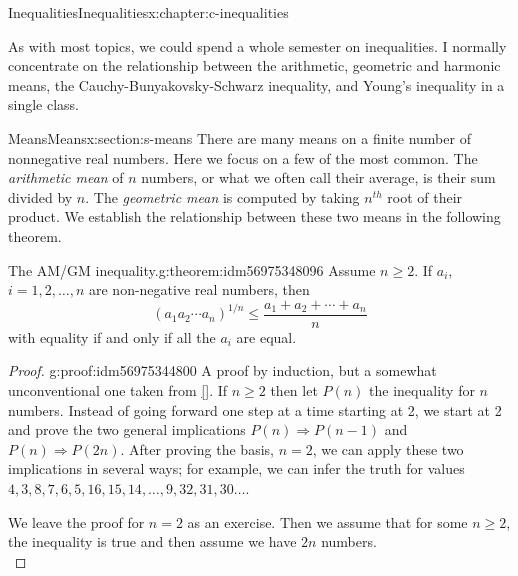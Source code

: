 \documentclass[twoside,10pt,]{book}
\newcommand{\xreffont}{\relax}
\numberwithin{equation}{section}
\begin{document}
\begin{chapterptx}{Inequalities}{}{Inequalities}{}{}{x:chapter:c-inequalities}
\begin{introduction}{}%
As with most topics, we could spend a whole semester on inequalities.  I normally concentrate on the relationship between the arithmetic, geometric and harmonic means, the Cauchy-Bunyakovsky-Schwarz inequality, and Young's inequality in a single class.%
\end{introduction}%
%
%
\typeout{************************************************}
\typeout{************************************************}
%
\begin{sectionptx}{Means}{}{Means}{}{}{x:section:s-means}
%
%
There are many means on a finite number of nonnegative real numbers.  Here we focus on a few of the most common.  The \emph{arithmetic mean} of \(n\) numbers, or what we often call their average, is their sum divided by \(n\).  The \emph{geometric mean} is computed by taking \(n^{th}\) root of their product.  We establish the relationship between these two means in the following theorem.%
\begin{theorem}{The AM\slash{}GM inequality.}{}{g:theorem:idm56975348096}%
%
Assume \(n \geq 2\).  If \(a_i\), \(i = 1, 2, \dots, n\) are non-negative real numbers, then%
\begin{equation*}
\left(a_1 a_2\cdots  a_n\right)^{1/n}\leq  \frac{a_1+a_2+\cdots +a_n}{n}
\end{equation*}
with equality if and only if all the \(a_i\) are equal.%
\end{theorem}
\begin{proof}{}{g:proof:idm56975344800}
A proof by induction, but a somewhat unconventional one taken from \hyperlink{x:biblio:biblio-aigner}{[{\xreffont 1}]}. If \(n \ge 2\) then let \(P(n)\) the inequality for \(n\) numbers.  Instead of going forward one step at a time starting at 2, we start at 2 and prove the two general implications  \(P(n)\Rightarrow P(n-1)\)  and \(P(n)\Rightarrow P(2n)\).  After proving the basis, \(n=2\), we can apply these two implications in several ways; for example, we can infer the truth for values \(4, 3, 8, 7, 6, 5, 16, 15, 14, \dots, 9, 32, 31, 30 \dots\).%
\par
We leave the proof for \(n=2\) as an exercise.  Then we assume that for some \(n \geq 2\), the inequality is true and then assume we have \(2n\) numbers.%
\begin{equation*}

\end{equation*}
\end{proof}
\end{sectionptx}
\end{chapterptx}
\end{document}
